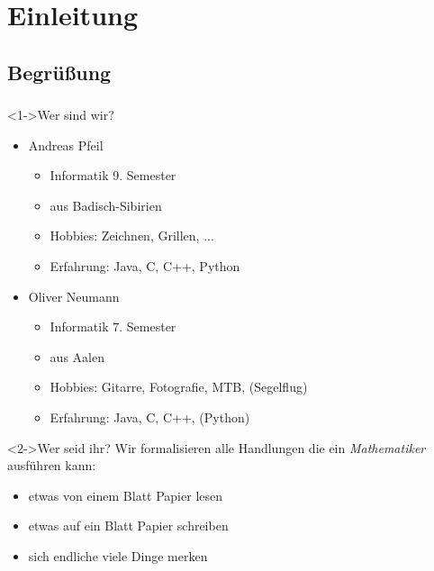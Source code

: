 \section{Einleitung}
\subsection{Begrüßung}
\begin{frame}
	\frametitle{\currentsection}
	\framesubtitle{\currentsubsection}
  \begin{block}<1->{Wer sind wir?}
  \begin{itemize}
  	\item Andreas Pfeil
  	\begin{itemize}
  		\item Informatik 9. Semester
  		\item aus Badisch-Sibirien
  		\item Hobbies: Zeichnen, Grillen, ...
  		\item Erfahrung: Java, C, C++, Python
  	\end{itemize}
  	\item Oliver Neumann
	\begin{itemize}
		\item Informatik 7. Semester
		\item aus Aalen
		\item Hobbies: Gitarre, Fotografie, MTB, (Segelflug)
		\item Erfahrung: Java, C, C++, (Python)
	\end{itemize}
  \end{itemize}
  \end{block}
  \begin{block}<2->{Wer seid ihr?}
    Wir formalisieren alle Handlungen die ein \emph{Mathematiker} ausführen kann:
    \begin{itemize}
      \item etwas von einem Blatt Papier lesen
      \item etwas auf ein Blatt Papier schreiben
      \item sich endliche viele Dinge merken
    \end{itemize}
  \end{block}
\end{frame}